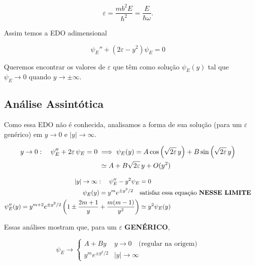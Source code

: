 \begin{equation}
    \varepsilon = \frac{mb^2 E}{\hbar^2} = \frac{E}{\hbar\omega}.
\label{eq:aula16_energia_adimensional}
\end{equation}

Assim temos a EDO adimensional

\begin{equation}
    \boxed{\psi_E'' + (2\varepsilon - y^2)\psi_E = 0}
\label{eq:aula16_edo_adimensional}
\end{equation}

Queremos encontrar os valores de $\varepsilon$ que têm como solução $\psi_E(y)$ tal que $\psi_E \to 0$ quando $y \to \pm\infty$.

\subsection*{Análise Assintótica}

Como essa EDO não é conhecida, analisamos a forma de sua solução (para um $\varepsilon$ genérico) em $y \to 0$ e $|y| \to \infty$.

\begin{align}
    y \to 0: \quad \psi_E'' + 2\varepsilon\,\psi_E = 0 \;&\Longrightarrow\; \psi_E(y) = A\cos\left(\sqrt{2\varepsilon}\,y\right) + B\sin\left(\sqrt{2\varepsilon}\,y\right) \notag \\
    &\simeq A + B\sqrt{2\varepsilon}\,y + O(y^2)
\label{eq:aula16_assintotica_y0}
\end{align}

\begin{align}
    |y| \to \infty: \quad \psi_E'' - y^2 \psi_E &= 0 \notag \\
    \psi_E(y) = y^m e^{\pm y^2/2} \quad &\text{satisfaz essa equação \textbf{NESSE LIMITE}} \notag \\
    \psi_E''(y) = y^{m+2}e^{\pm y^2/2}\left( 1 \pm \frac{2m+1}{y} + \frac{m(m-1)}{y^2} \right) &\simeq y^2 \psi_E(y)
\label{eq:aula16_assintotica_infinito}
\end{align}

Essas análises mostram que, para um $\varepsilon$ \textbf{GENÉRICO},

\begin{equation}
    \psi_E \to
    \begin{cases}
        A + By & y \to 0 \quad \text{(regular na origem)} \\
        y^m e^{\pm y^2/2} & |y| \to \infty
    \end{cases}
\label{eq:aula16_comportamento_geral}
\end{equation}

